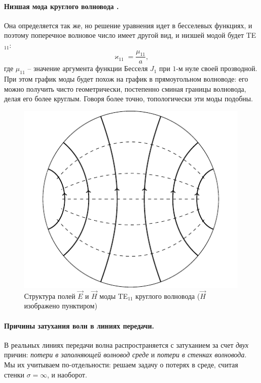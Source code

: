 \documentclass[a4paper,14pt]{extarticle}
\begin{document}
\paragraph{Низшая мода круглого волновода .} Она определяется так же, но решение уравнения идет в бесселевых функциях, и поэтому поперечное волновое число имеет другой вид, и низшей модой будет TE${}_{11}$:
\begin{equation}
	\varkappa_{11}=\frac{\mu_{11}}{a},
\end{equation}
где $\mu_{11}$ -- значение аргумента функции Бесселя $J_1$ при   $1$-м нуле своей прозводной. При этом график моды будет похож на график в прямоугольном волноводе: его можно получить чисто геометрически, постепенно сминая границы волновода, делая его более круглым. Говоря более точно, топологически эти моды подобны.
\begin{figure}[h!]
	\centering
	\includegraphics[scale=1.5]{img_lect5/cylindric/TE11.pdf}
	\caption{Структура полей $\vec{E}$ и $\vec{H}$ моды TE${}_{11}$ круглого волновода ($\vec{H}$ изображено пунктиром)}
	\label{fig:lect4:8}
\end{figure}





%

\paragraph{Причины затухания волн в линиях передачи.} В реальных линиях передачи волна распространяется с затуханием за счет \textit{двух} причин: \textit{потери в заполняющей волновод среде} и \textit{потери в стенках волновода}. Мы их учитываем по-отдельности: решаем задачу о потерях в среде, считая стенки $\sigma=\infty$, и наоборот.
\end{document}
